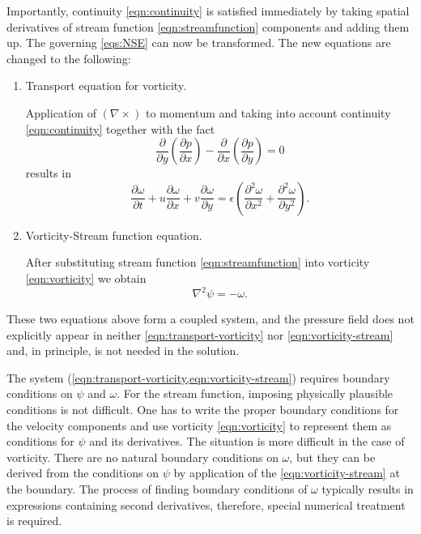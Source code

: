 \documentclass{article}
\numberwithin{equation}{section}
\begin{document}
	Importantly, continuity \cref{eqn:continuity} is satisfied immediately by taking spatial derivatives of stream function \cref{eqn:streamfunction} components and adding them up. The governing \cref{eqs:NSE} can now be transformed. The new equations are changed to the following:
	\begin{enumerate}
		\item 
			Transport equation for vorticity.
			
			Application of $(\nabla \times)$ to momentum and taking into account continuity \cref{eqn:continuity} together with the fact
			\begin{equation*}
				\frac{\partial}{\partial y}\left(\frac{\partial p}{\partial x}\right) - 
				\frac{\partial}{\partial x}\left(\frac{\partial p}{\partial y}\right)=0
			\end{equation*}
			results in
			\begin{equation}
			\label{eqn:transport-vorticity}
				\boxed{
				\frac{\partial\omega}{\partial t} 
				+ u \frac{\partial\omega}{\partial x} 
				+ v\frac{\partial\omega}{\partial y} 
				= \epsilon \left(\frac{\partial ^2 \omega}{\partial x^2} 
				+ \frac{\partial^2 \omega}{\partial y^2} \right).
				}
			\end{equation}
			
		\item 
		Vorticity-Stream function equation.
		
		After substituting stream function \cref{eqn:streamfunction} into vorticity \cref{eqn:vorticity} we obtain
		\begin{equation}
			\label{eqn:vorticity-stream}
			\boxed{\nabla ^2 \psi = -\omega.}
		\end{equation}	
	\end{enumerate}
	
	These two equations above form a coupled system, and the pressure field does not explicitly appear in neither \cref{eqn:transport-vorticity} nor \cref{eqn:vorticity-stream} and, in principle, is not needed in the solution.
	
	The system (\cref{eqn:transport-vorticity,eqn:vorticity-stream}) requires boundary conditions on $\psi$ and $\omega$. For the stream function, imposing physically plausible conditions is not difficult. One has to write the proper boundary conditions for the velocity components and use vorticity \cref{eqn:vorticity} to represent them as conditions for $\psi$ and its derivatives. The situation is more difficult in the case of vorticity. There are no natural boundary conditions on $\omega$, but they can be derived from the conditions on $\psi$ by application of the \cref{eqn:vorticity-stream} at the boundary. The process of finding boundary conditions of $\omega$ typically results in expressions containing second derivatives, therefore, special numerical treatment is required.
	
\end{document}

